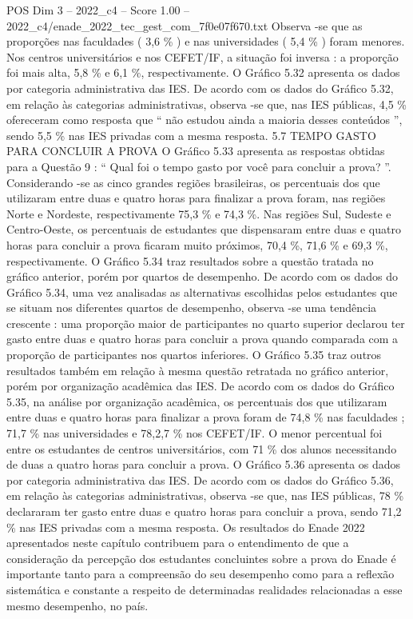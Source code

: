 \begin{textsample}{POS Dim 3 – 2022\_c4 – Score 1.00 – 2022\_c4/enade\_2022\_tec\_gest\_com\_7f0e07f670.txt}
Observa -se que as proporções nas faculdades ( 3,6 \% ) e nas universidades ( 5,4 \% ) foram menores.
Nos centros universitários e nos CEFET/IF, a situação foi inversa : a proporção foi mais alta, 5,8 \% e 6,1 \%, respectivamente.
O Gráfico 5.32 apresenta os dados por categoria administrativa das IES.
De acordo com os dados do Gráfico 5.32, em relação às categorias administrativas, observa -se que, nas IES públicas, 4,5 \% ofereceram como resposta que “ não estudou ainda a maioria desses conteúdos ”, sendo 5,5 \% nas IES privadas com a mesma resposta. 5.7 TEMPO GASTO PARA CONCLUIR A PROVA O Gráfico 5.33 apresenta as respostas obtidas para a Questão 9 : “ Qual foi o tempo gasto por você para concluir a prova? ”.
Considerando -se as cinco grandes regiões brasileiras, os percentuais dos que utilizaram entre duas e quatro horas para finalizar a prova foram, nas regiões Norte e Nordeste, respectivamente 75,3 \% e 74,3 \%.
Nas regiões Sul, Sudeste e Centro-Oeste, os percentuais de estudantes que dispensaram entre duas e quatro horas para concluir a prova ficaram muito próximos, 70,4 \%, 71,6 \% e 69,3 \%, respectivamente.
O Gráfico 5.34 traz resultados sobre a questão tratada no gráfico anterior, porém por quartos de desempenho.
De acordo com os dados do Gráfico 5.34, uma vez analisadas as alternativas escolhidas pelos estudantes que se situam nos diferentes quartos de desempenho, observa -se uma tendência crescente : uma proporção maior de participantes no quarto superior declarou ter gasto entre duas e quatro horas para concluir a prova quando comparada com a proporção de participantes nos quartos inferiores.
O Gráfico 5.35 traz outros resultados também em relação à mesma questão retratada no gráfico anterior, porém por organização acadêmica das IES.
De acordo com os dados do Gráfico 5.35, na análise por organização acadêmica, os percentuais dos que utilizaram entre duas e quatro horas para finalizar a prova foram de 74,8 \% nas faculdades ; 71,7 \% nas universidades e 78,2,7 \% nos CEFET/IF.
O menor percentual foi entre os estudantes de centros universitários, com 71 \% dos alunos necessitando de duas a quatro horas para concluir a prova.
O Gráfico 5.36 apresenta os dados por categoria administrativa das IES.
De acordo com os dados do Gráfico 5.36, em relação às categorias administrativas, observa -se que, nas IES públicas, 78 \% declararam ter gasto entre duas e quatro horas para concluir a prova, sendo 71,2 \% nas IES privadas com a mesma resposta.
Os resultados do Enade 2022 apresentados neste capítulo contribuem para o entendimento de que a consideração da percepção dos estudantes concluintes sobre a prova do Enade é importante tanto para a compreensão do seu desempenho como para a reflexão sistemática e constante a respeito de determinadas realidades relacionadas a esse mesmo desempenho, no país.

\end{textsample}
